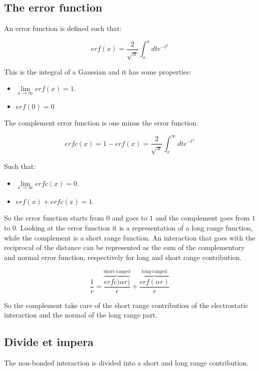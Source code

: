 	\subsection{The error function}
	An error function is defined such that:

	$$erf(x) = \frac{2}{\sqrt{\pi}}\int_o^x dte^{-t^2}$$

	This is the integral of a Gaussian and it has some properties:

	\begin{multicols}{2}
		\begin{itemize}
			\item $\lim\limits_{x\rightarrow \infty}erf(x) = 1$.
			\item $erf(0) = 0$
		\end{itemize}
	\end{multicols}

	The complement error function is one minus the error function:

	$$erfc(x) = 1- erf(x) = \frac{2}{\sqrt{\pi}}\int_x^\infty dte^{-t^2}$$

	Such that:

	\begin{multicols}{2}
		\begin{itemize}
			\item $\lim\limits_{x\rightarrow\infty} erfc(x) = 0$.
			\item $erf(x) + erfc(x) = 1$.
		\end{itemize}
	\end{multicols}

	So the error function starts from $0$ and goes to $1$ and the complement goes from $1$ to $0$.
	Looking at the error function it is a representation of a long range function, while the complement is a short range function.
	An interaction that goes with the reciprocal of the distance can be represented as the sum of the complementary and normal error function, respectively for long and short range contribution.

	$$\frac{1}{r} = \overbrace{\frac{erfc)\alpha r)}{r}}^{\text{short-ranged}} + \overbrace{\frac{erf(\alpha r)}{r}}^{\text{long-ranged}}$$

	So the complement take care of the short range contribution of the electrostatic interaction and the normal of the long range part.

	\subsection{Divide et impera}
	The non-bonded interaction is divided into a short and long range contribution.

